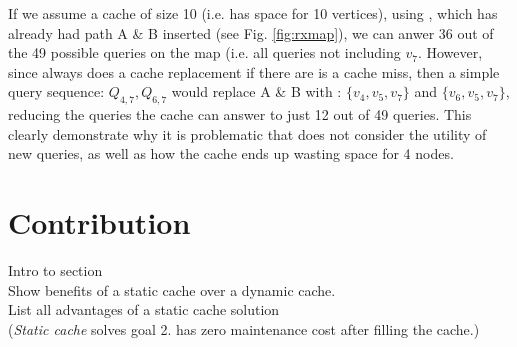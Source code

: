 If we assume a cache of size 10 (i.e. has space for 10 vertices), using \lruns, which has already had path A \& B inserted (see Fig. \ref{fig:rxmap}), we can anwer 36 out of the 49 possible queries on the map (i.e. all queries not including $v_7$. However, since \lru always does a cache replacement if there are is a cache miss, then a simple query sequence: $Q_{4,7},Q_{6,7}$ would replace A \& B with \spathns: $\{v_4,v_5,v_7\}$ and $\{v_6,v_5,v_7\}$, reducing the queries the cache can answer to just 12 out of 49 queries. This clearly demonstrate why it is problematic that \lru does not consider the utility of new queries, as well as how the cache ends up wasting space for 4 nodes.













\section{Contribution} \label{sec:contribution}

Intro to section \\
Show benefits of a static cache over a dynamic cache.\\
List all advantages of a static cache solution \\
(\textit{Static cache} solves goal 2. has zero maintenance cost after filling the cache.)

